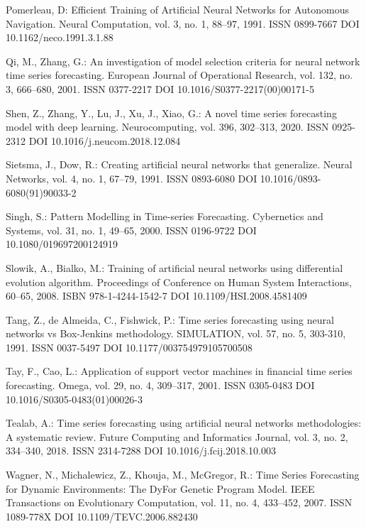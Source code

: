 \begin{thebibliography}{99.}
 Pomerleau, D: Efficient Training of Artificial Neural Networks for Autonomous Navigation. Neural Computation, vol. 3, no. 1, 88--97, 1991. ISSN 0899-7667 DOI 10.1162/neco.1991.3.1.88

 Qi, M., Zhang, G.: An investigation of model selection criteria for neural network time series forecasting. European Journal of Operational Research, vol. 132, no. 3, 666--680, 2001. ISSN 0377-2217 DOI 10.1016/S0377-2217(00)00171-5

 Shen, Z., Zhang, Y., Lu, J., Xu, J., Xiao, G.: A novel time series forecasting model with deep learning. Neurocomputing, vol. 396, 302--313, 2020. ISSN 0925-2312 DOI 10.1016/j.neucom.2018.12.084

 Sietsma, J., Dow, R.: Creating artificial neural networks that generalize. Neural Networks, vol. 4, no. 1, 67--79, 1991. ISSN 0893-6080 DOI 10.1016/0893-6080(91)90033-2

 Singh, S.: Pattern Modelling in Time-series Forecasting. Cybernetics and Systems, vol. 31, no. 1, 49--65, 2000. ISSN 0196-9722 DOI 10.1080/019697200124919

 Slowik, A., Bialko, M.: Training of artificial neural networks using differential evolution algorithm. Proceedings of Conference on Human System Interactions, 60--65, 2008. ISBN 978-1-4244-1542-7 DOI 10.1109/HSI.2008.4581409

 Tang, Z., de Almeida, C., Fishwick, P.: Time series forecasting using neural networks vs Box-Jenkins methodology. SIMULATION, vol. 57, no. 5, 303-310, 1991. ISSN 0037-5497 DOI 10.1177/003754979105700508

 Tay, F., Cao, L.: Application of support vector machines in financial time series forecasting. Omega, vol. 29, no. 4, 309--317, 2001. ISSN 0305-0483 DOI 10.1016/S0305-0483(01)00026-3

 Tealab, A.: Time series forecasting using artificial neural networks methodologies: A systematic review. Future Computing and Informatics Journal, vol. 3, no. 2, 334--340, 2018. ISSN 2314-7288 DOI 10.1016/j.fcij.2018.10.003

 Wagner, N., Michalewicz, Z., Khouja, M., McGregor, R.: Time Series Forecasting for Dynamic Environments: The DyFor Genetic Program Model. IEEE Transactions on Evolutionary Computation, vol. 11, no. 4, 433--452, 2007. ISSN 1089-778X DOI 10.1109/TEVC.2006.882430


\end{thebibliography}
